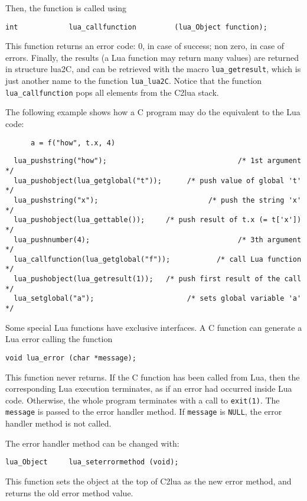Then, the function is called using
\begin{verbatim}
int            lua_callfunction         (lua_Object function);
\end{verbatim}
This function returns an error code:
0, in case of success; non zero, in case of errors.
Finally, the results (a Lua function may return many values)
are returned in structure lua2C,
and can be retrieved with the macro \verb|lua_getresult|,
which is just another name to the function \verb|lua_lua2C|.
Notice that the function \verb|lua_callfunction|
pops all elements from the C2lua stack.

The following example shows how a C program may do the
equivalent to the Lua code:
\begin{verbatim}
      a = f("how", t.x, 4)
\end{verbatim}
\begin{verbatim}
  lua_pushstring("how");                               /* 1st argument */
  lua_pushobject(lua_getglobal("t"));      /* push value of global 't' */
  lua_pushstring("x");                          /* push the string 'x' */
  lua_pushobject(lua_gettable());     /* push result of t.x (= t['x']) */
  lua_pushnumber(4);                                   /* 3th argument */
  lua_callfunction(lua_getglobal("f"));           /* call Lua function */
  lua_pushobject(lua_getresult(1));   /* push first result of the call */
  lua_setglobal("a");                      /* sets global variable 'a' */
\end{verbatim}

Some special Lua functions have exclusive interfaces.
A C function can generate a Lua error calling the function
\begin{verbatim}
void lua_error (char *message);
\end{verbatim}
This function never returns.
If the C function has been called from Lua,
then the corresponding Lua execution terminates,
as if an error had occurred inside Lua code.
Otherwise, the whole program terminates with a call to \verb|exit(1)|.
The \verb|message| is passed to the error handler method.
If \verb|message| is \verb|NULL|,
the error handler method is not called.

The error handler method  can be changed with:
\begin{verbatim}
lua_Object     lua_seterrormethod (void);
\end{verbatim}
This function sets the object at the top of C2lua
as the new error method,
and returns the old error method value.

